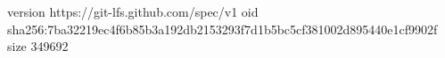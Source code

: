 version https://git-lfs.github.com/spec/v1
oid sha256:7ba32219ec4f6b85b3a192db2153293f7d1b5bc5cf381002d895440e1cf9902f
size 349692
